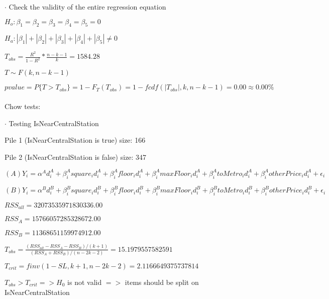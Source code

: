\documentclass{article}
\begin{document}
$\cdot$ Check the validity of the entire regression equation

$H_o: \beta_1=\beta_2=\beta_3=\beta_4=\beta_5=0$

$H_a: |\beta_1|+|\beta_2|+|\beta_3|+|\beta_4|+|\beta_5|\neq0$

$T_{obs}=\frac{R^2}{1-R^2}*\frac{n-k-1}{k}=1584.28$

$T\sim F(k,n-k-1)$

$pvalue=P\{T>T_{obs}\}=1-F_T(T_{obs})=1-fcdf(|T_{obs}|,k,n-k-1)=0.00\approx0.00\%$
\\\\Chow tests:

$\cdot$ Testing IsNearCentralStation

Pile 1 (IsNearCentralStation is true) size: 166

Pile 2 (IsNearCentralStation is false) size: 347

$(A)Y_i=\alpha^Ad^A_i+\beta^A_isquare_id^A_i+\beta^A_ifloor_id^A_i+\beta^A_imaxFloor_id^A_i+\beta^A_itoMetro_id^A_i+\beta^A_iotherPrice_id^A_i+\epsilon_i$

$(B)Y_i=\alpha^Bd^B_i+\beta^B_isquare_id^B_i+\beta^B_ifloor_id^B_i+\beta^B_imaxFloor_id^B_i+\beta^B_itoMetro_id^B_i+\beta^B_iotherPrice_id^B_i+\epsilon_i$

$RSS_{all}=32073535971830336.00$

$RSS_A=15766057285328672.00$

$RSS_B=11368651159974912.00$

$T_{obs}=\frac{(RSS_{all}-RSS_A-RSS_B)/(k+1)}{(RSS_A+RSS_B)/(n - 2k - 2)}=15.1979557582591$

$T_{crit}=finv(1 - SL, k + 1, n - 2k - 2)=2.1166649375737814$

$T_{obs}>T_{crit}=>H_0$ is not valid $=>$ items should be split on IsNearCentralStation
\end{document}
